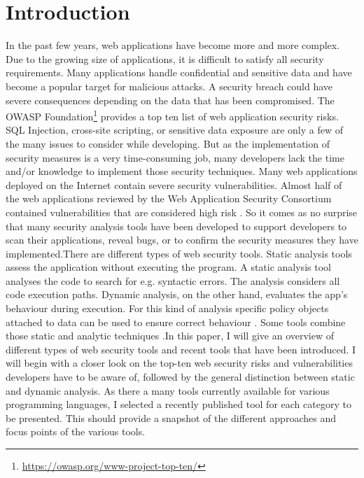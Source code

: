 \section{Introduction}
\label{section:Introduction}
In the past few years, web applications have become more and more complex. Due to the growing size of applications, it is difficult to satisfy all security requirements. Many applications handle confidential and sensitive data and have become a popular target for malicious attacks. A security breach could have severe consequences depending on the data that has been compromised.\newline
The OWASP Foundation\footnote{ \url{https://owasp.org/www-project-top-ten/}} provides a top ten list of web application security risks. SQL Injection, cross-site scripting, or sensitive data exposure are only a few of the many issues to consider while developing. But as the implementation of security measures is a very time-consuming job, many developers lack the time and/or knowledge to implement those security techniques. Many web applications deployed on the Internet contain severe security vulnerabilities. Almost half of the web applications reviewed by the Web Application Security Consortium contained vulnerabilities that are considered high risk \autocite[2]{Li2014}.
So it comes as no surprise that many security analysis tools have been developed to support developers to scan their applications, reveal bugs, or to confirm the security measures they have implemented.\newline There are different types of web security tools. Static analysis tools assess the application without executing the program. A static analysis tool analyses the code to search for e.g. syntactic errors. The analysis considers all code execution paths. Dynamic analysis, on the other hand, evaluates the app's behaviour during execution. For this kind of analysis specific policy objects attached to data can be used to ensure correct behaviour \autocite[]{Yip2009, Felt2011}. Some tools combine those static and analytic techniques \autocite[]{Araujo2018, Jahanshahi2018, Lam2008,Hosek2011}.\newline In this paper, I will give an overview of different types of web security tools and recent tools that have been introduced. I will begin with a closer look on the top-ten web security risks and vulnerabilities developers have to be aware of, followed by the general distinction between static and dynamic analysis. As there a many tools currently available for various programming languages, I selected a recently published tool for each category to be presented. This should provide a snapshot of the different approaches and focus points of the various tools.

